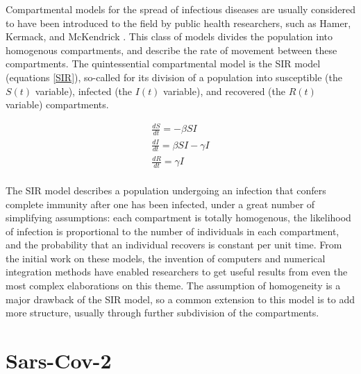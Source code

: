 Compartmental models for the spread of infectious diseases are usually considered to have been introduced to the field by public health researchers, such as Hamer, Kermack, and McKendrick \cite{hamer1906epidemic, kermack1927contribution, brauer2019mathematical,edelstein2005mathematical}. This class of models divides the population into homogenous compartments, and describe the rate of movement between these compartments. The quintessential compartmental model is the SIR model (equations \ref{SIR}), so-called for its division of a population into susceptible (the $S(t)$ variable), infected (the $I(t)$ variable), and recovered (the $R(t)$ variable) compartments.

\begin{eqnarray}
    \frac{dS}{dt} = -\beta S I  \\
    \frac{dI}{dt} = \beta S I - \gamma I\\
    \frac{dR}{dt} = \gamma I\\
    \label{SIR}
\end{eqnarray}

The SIR model describes a population undergoing an infection that confers complete immunity after one has been infected, under a great number of simplifying assumptions: each compartment is totally homogenous, the likelihood of infection is proportional to the number of individuals in each compartment, and the probability that an individual recovers is constant per unit time. From the initial work on these models, the invention of computers and numerical integration methods have enabled researchers to get useful results from even the most complex elaborations on this theme. The assumption of homogeneity is a major drawback of the SIR model, so a common extension to this model is to add more structure, usually through further subdivision of the compartments. 

\section{Sars-Cov-2}

